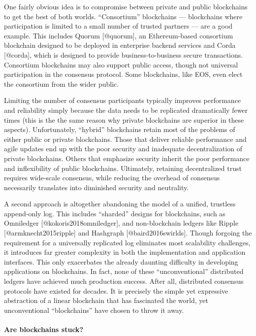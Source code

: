 \documentclass[]{article}
\let\oldparagraph\paragraph
\renewcommand{\paragraph}[1]{\oldparagraph{#1}\mbox{}}
\begin{document}
One fairly obvious idea is to compromise between private and public
blockchains to get the best of both worlds. ``Consortium'' blockchains
--- blockchains where participation is limited to a small number of
trusted partners --- are a good example. This includes Quorum
{[}@quorum{]}, an Ethereum-based consortium blockchain designed to be
deployed in enterprise backend services and Corda {[}@corda{]}, which is
designed to provide business-to-business secure transactions. Consortium
blockchains may also support public access, though not universal
participation in the consensus protocol. Some blockchains, like EOS,
even elect the consortium from the wider public.

Limiting the number of consensus participants typically improves
performance and reliability simply because the data needs to be
replicated dramatically fewer times (this is the the same reason why
private blockchains are superior in these aspects). Unfortunately,
``hybrid'' blockchains retain most of the problems of either public or
private blockchains. Those that deliver reliable performance and agile
updates end up with the poor security and inadequate decentralization of
private blockchains. Others that emphasize security inherit the poor
performance and inflexibility of public blockchains. Ultimately,
retaining decentralized trust requires wide-scale consensus, while
reducing the overhead of consensus necessarily translates into
diminished security and neutrality.

A second approach is altogether abandoning the model of a unified,
trustless append-only log. This includes ``sharded'' designs for
blockchains, such as Omniledger {[}@kokoris2018omniledger{]}, and
non-blockchain ledgers like Ripple {[}@armknecht2015ripple{]} and
Hashgraph {[}@baird2016swirlds{]}. Though forgoing the requirement for a
universally replicated log eliminates most scalability challenges, it
introduces far greater complexity in both the implementation and
application interfaces. This only exacerbates the already daunting
difficulty in developing applications on blockchains. In fact, none of
these ``unconventional'' distributed ledgers have achieved much
production success. After all, distributed consensus protocols have
existed for decades. It is precisely the simple yet expressive
abstraction of a linear blockchain that has fascinated the world, yet
unconventional ``blockchains'' have chosen to throw it away.

\hypertarget{are-blockchains-stuck}{%
\paragraph{Are blockchains stuck?}\label{are-blockchains-stuck}}
\end{document}
